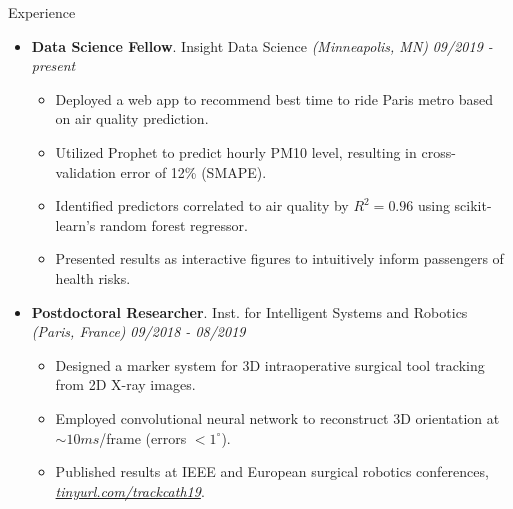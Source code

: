 \documentclass{resume} %
\begin{document}
\begin{rSection}{Experience}
	
	\begin{itemize}[leftmargin=0em]
	\item {\bf Data Science Fellow}{. Insight Data Science \textit{(Minneapolis, MN)}} \hfill {\em 09/2019 - present}\\
	\vspace{-5mm}
	\begin{itemize}
		\setlength\itemsep{-1.75em}
		\item Deployed a web app to recommend best time to ride Paris metro based on air quality prediction.\\
		\item Utilized Prophet to predict hourly PM10 level, resulting in cross-validation error of 12\% (SMAPE).\\
		\item Identified predictors correlated to air quality by $R^2 = 0.96$ using scikit-learn's random forest regressor.\\
		\item Presented results as interactive figures to intuitively inform passengers of health risks.
	\end{itemize}	
	
	\item {\bf Postdoctoral Researcher}{. Inst. for Intelligent Systems and Robotics \textit{(Paris, France)}} \hfill {\em 09/2018 - 08/2019}\\
	\vspace{-5mm}
	\begin{itemize}
		\setlength\itemsep{-1.75em}
		\item  Designed a marker system for 3D intraoperative surgical tool tracking from 2D X-ray images.\\ 
		\item  Employed convolutional neural network to reconstruct 3D orientation at $\sim 10 ms$/frame (errors $< 1 ^\circ$).\\
		\item  Published results at IEEE and European surgical robotics conferences, \textit{\href{tinyurl.com/trackcath19}{tinyurl.com/trackcath19}}.
	\end{itemize}
	

\end{itemize}
\end{rSection}
\end{document}
